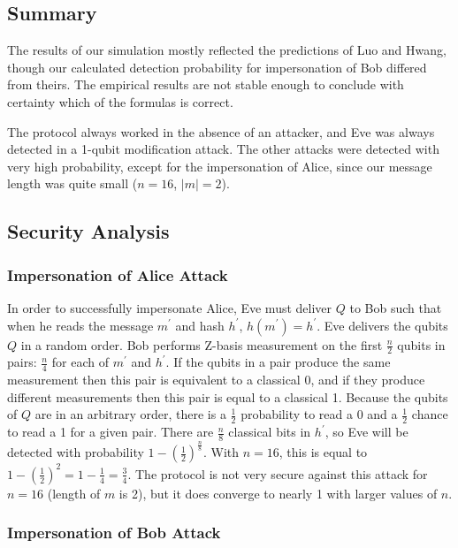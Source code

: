 \documentclass[conference,compsoc]{IEEEtran}
\begin{document}
\subsection{Summary}

The results of our simulation mostly reflected the predictions of Luo and Hwang,
though our calculated detection probability for impersonation of Bob differed from theirs.
The empirical results are not stable enough to conclude with certainty which of the formulas is correct.

The protocol always worked in the absence of an attacker, and Eve was always detected
in a 1-qubit modification attack. The other attacks were detected with very high probability,
except for the impersonation of Alice, since our message length was quite small ($n=16$, $|m|=2$).

\subsection{Security Analysis} \label{sect:securityAnalysis}

\subsubsection{Impersonation of Alice Attack}

In order to successfully impersonate Alice, Eve must deliver $Q$ to Bob
such that when he reads the message $m^{\prime}$ and hash $h^{\prime}$,
$h\left(m^{\prime}\right)=h^{\prime}$. Eve delivers the qubits $Q$ in a random order.
Bob performs Z-basis measurement on the first $\frac{n}{2}$ qubits in pairs:
$\frac{n}{4}$ for each of $m^{\prime}$ and $h^{\prime}$. If the qubits in a pair
produce the same measurement then this pair is equivalent to a classical 0, and if they produce
different measurements then this pair is equal to a classical 1. Because the qubits of $Q$
are in an arbitrary order, there is a $\frac{1}{2}$ probability to read a 0
and a $\frac{1}{2}$ chance to read a 1 for a given pair. There are $\frac{n}{8}$ classical
bits in $h^{\prime}$, so Eve will be detected with probability $1 - \left(\frac{1}{2}\right)^{\frac{n}{8}}$.
With $n=16$, this is equal to $1 - \left(\frac{1}{2}\right)^{2} = 1 - \frac{1}{4} = \frac{3}{4}$.
The protocol is not very secure against this attack for $n=16$ (length of $m$ is 2),
but it does converge to nearly 1 with larger values of $n$.

\subsubsection{Impersonation of Bob Attack}
\end{document}
